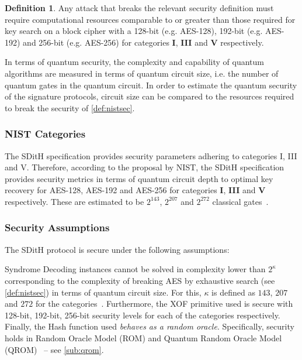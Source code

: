 \documentclass[11pt]{report}
\theoremstyle{definition}
\newtheorem{definition}{Definition}[section]
\theoremstyle{plain}
\begin{document}
\begin{definition}\label{def:nistsec}
  Any attack that breaks the relevant security definition must require computational resources comparable to or greater than those required for key search on a block cipher with a 128-bit (e.g. AES-128), 192-bit (e.g. AES-192) and 256-bit (e.g. AES-256) for categories \textbf{I}, \textbf{III} and \textbf{V} respectively.
\end{definition}

In terms of quantum security, the complexity and capability of quantum algorithms are measured in terms of quantum circuit size, i.e. the number of quantum gates in the quantum circuit. In order to estimate the quantum security of the signature protocols, circuit size can be compared to the resources required to break the security of \autoref{def:nistsec}.

\subsubsection{NIST Categories}

The SDitH specification provides security parameters adhering to categories I, III and V. Therefore, according to the proposal by NIST, the SDitH specification provides security metrics in terms of quantum circuit depth to optimal key recovery for AES-128, AES-192 and AES-256 for categories \textbf{I}, \textbf{III} and \textbf{V} respectively. These are estimated to be $2^{143}$, $2^{207}$ and $2^{272}$ classical gates~\cite{nistcall}.

\subsubsection{Security Assumptions}

The SDitH protocol is secure under the following assumptions:

Syndrome Decoding instances cannot be solved in complexity lower than $2^\kappa$ corresponding to the complexity of breaking AES by exhaustive search (see \autoref{def:nistsec}) in terms of quantum circuit size. For this, $\kappa$ is defined as $143$, $207$ and $272$ for the categories~\cite{nistcall}. Furthermore, the XOF primitive used is secure with 128-bit, 192-bit, 256-bit security levels for each of the categories respectively. Finally, the Hash function used \textit{behaves as a random oracle}. Specifically, security holds in Random Oracle Model (ROM) and Quantum Random Oracle Model (QROM)~\cite{aguilarsyndrome11} -- see \autoref{sub:qrom}.
\end{document}
